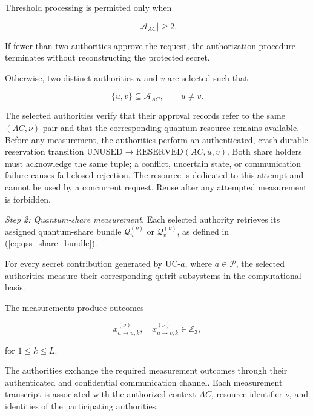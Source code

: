 \documentclass[twocolumn,10pt,journal]{IEEEtran}
\begin{document}
Threshold processing is permitted only when

\begin{equation}
|\mathcal{A}_{AC}|\geq 2.
\label{eq:qsv2g_approval_threshold}
\end{equation}

If fewer than two authorities approve the request,
the authorization procedure terminates without
reconstructing the protected secret.

Otherwise, two distinct authorities $u$ and $v$
are selected such that

\begin{equation}
\{u,v\}\subseteq\mathcal{A}_{AC},
\qquad
u\neq v.
\label{eq:qsv2g_selected_pair}
\end{equation}

The selected authorities verify that their approval
records refer to the same $(AC,\nu)$ pair and that
the corresponding quantum resource remains available.
Before any measurement, the authorities perform an authenticated,
crash-durable reservation transition
$\mathrm{UNUSED}\rightarrow\mathrm{RESERVED}(AC,u,v)$.
Both share holders must acknowledge the same tuple; a conflict,
uncertain state, or communication failure causes fail-closed rejection.
The resource is dedicated to this attempt and cannot be used by a
concurrent request. Reuse after any attempted measurement is forbidden.

\textit{Step 2: Quantum-share measurement.}
Each selected authority retrieves its assigned
quantum-share bundle $\mathcal{Q}_{u}^{(\nu)}$
or $\mathcal{Q}_{v}^{(\nu)}$, as defined in
(\ref{eq:qss_share_bundle}).

For every secret contribution generated by UC-$a$,
where $a\in\mathcal{P}$, the selected authorities
measure their corresponding qutrit subsystems in
the computational basis.

The measurements produce outcomes

\begin{equation}
x_{a\rightarrow u,k}^{(\nu)},
\quad
x_{a\rightarrow v,k}^{(\nu)}
\in\mathbb{Z}_3,
\label{eq:qsv2g_qss_measurements}
\end{equation}

for $1\leq k\leq L$.

The authorities exchange the required measurement
outcomes through their authenticated and confidential
communication channel. Each measurement transcript
is associated with the authorized context $AC$,
resource identifier $\nu$, and identities of the
participating authorities.
\end{document}
